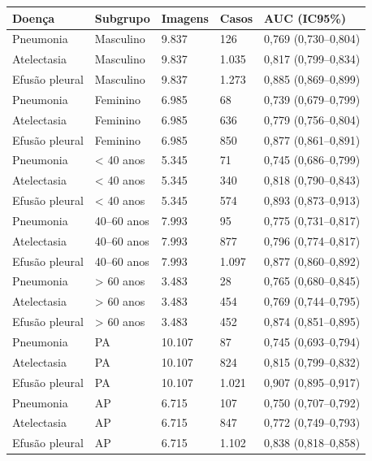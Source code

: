 \begin{tabular}{lllll}
\toprule
Doença & Subgrupo & Imagens & Casos & AUC (IC95\%) \\
\midrule
Pneumonia & Masculino & 9.837 & 126 & 0,769 (0,730–0,804) \\
Atelectasia & Masculino & 9.837 & 1.035 & 0,817 (0,799–0,834) \\
Efusão pleural & Masculino & 9.837 & 1.273 & 0,885 (0,869–0,899) \\
Pneumonia & Feminino & 6.985 & 68 & 0,739 (0,679–0,799) \\
Atelectasia & Feminino & 6.985 & 636 & 0,779 (0,756–0,804) \\
Efusão pleural & Feminino & 6.985 & 850 & 0,877 (0,861–0,891) \\
Pneumonia & < 40 anos & 5.345 & 71 & 0,745 (0,686–0,799) \\
Atelectasia & < 40 anos & 5.345 & 340 & 0,818 (0,790–0,843) \\
Efusão pleural & < 40 anos & 5.345 & 574 & 0,893 (0,873–0,913) \\
Pneumonia & 40–60 anos & 7.993 & 95 & 0,775 (0,731–0,817) \\
Atelectasia & 40–60 anos & 7.993 & 877 & 0,796 (0,774–0,817) \\
Efusão pleural & 40–60 anos & 7.993 & 1.097 & 0,877 (0,860–0,892) \\
Pneumonia & > 60 anos & 3.483 & 28 & 0,765 (0,680–0,845) \\
Atelectasia & > 60 anos & 3.483 & 454 & 0,769 (0,744–0,795) \\
Efusão pleural & > 60 anos & 3.483 & 452 & 0,874 (0,851–0,895) \\
Pneumonia & PA & 10.107 & 87 & 0,745 (0,693–0,794) \\
Atelectasia & PA & 10.107 & 824 & 0,815 (0,799–0,832) \\
Efusão pleural & PA & 10.107 & 1.021 & 0,907 (0,895–0,917) \\
Pneumonia & AP & 6.715 & 107 & 0,750 (0,707–0,792) \\
Atelectasia & AP & 6.715 & 847 & 0,772 (0,749–0,793) \\
Efusão pleural & AP & 6.715 & 1.102 & 0,838 (0,818–0,858) \\
\bottomrule
\end{tabular}
